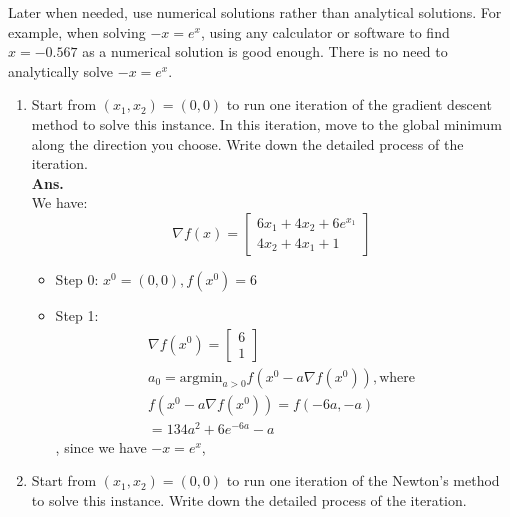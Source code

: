 \documentclass[12pt]{article}
\begin{document}
\begin{enumerate}
            Later when needed, use numerical solutions rather than analytical solutions. For example, when solving $-x = e^x$, using any calculator or software to find $x = -0.567$ as a numerical solution is good enough. There is no need to analytically solve $-x = e^x$.
            \begin{enumerate}
                  \item Start from $(x_1,x_2) = (0,0)$ to run one iteration of the gradient descent method to solve this instance. In this iteration, move to the global minimum along the direction you choose. Write down the detailed process of the iteration.\\
                        \textbf{Ans.}\\
                        We have:
                        \begin{equation*}
                              \nabla f(x) = \begin{bmatrix}
                                    6x_1+4x_2 + 6e^{x_1} \\
                                    4x_2+ 4x_1+1
                              \end{bmatrix}
                        \end{equation*}
                        \begin{itemize}
                              \item Step 0: $x^0 = (0,0), f(x^0) = 6$
                              \item Step 1:
                                    \begin{align*}
                                           & \nabla f(x^0) = \begin{bmatrix}
                                                                   6 \\
                                                                   1
                                                             \end{bmatrix}
                                           &                                                                        \\
                                           & a_0 =           \text{argmin}_{a>0}f(x^0-a\nabla f(x^0)),\text{where } \\
                                           & f(x^0-a\nabla f(x^0)) = f(-6a,-a)                                      \\
                                           & = 134a^2+6e^{-6a}-a
                                    \end{align*},
                                    since we have $-x = e^x$,
                        \end{itemize}
                  \item Start from $(x_1, x_2) = (0, 0)$ to run one iteration of the Newton’s method to solve this instance. Write down the detailed process of the iteration.
            \end{enumerate}
\end{enumerate}
\end{document}
